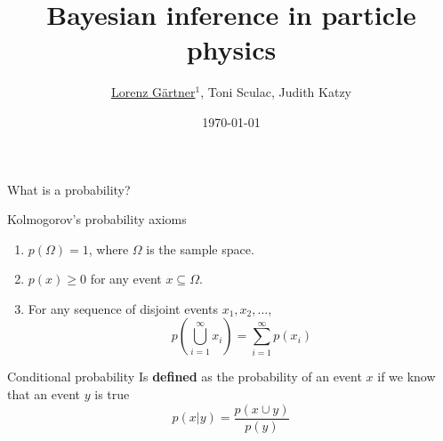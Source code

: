 \documentclass[
aspectratio=169,
14pt,
professionalfonts
]{beamer}
\title[]{Bayesian inference in particle physics}
\author[L. G\"artner]{\underline{Lorenz G\"artner}$^{1}$, Toni Sculac, Judith Katzy }
\institute[LMU]{$^1$LMU Munich}
\date{\today}
\begin{document}
\begin{frame}[titleslide]
    \titlepage
\end{frame}

\begin{frame}

\centering
\Large
What is a probability?
\end{frame}

\begin{frame}{Kolmogorov's probability axioms}
\begin{enumerate}
  \item $ p(\Omega) = 1 $, where \( \Omega \) is the sample space.
  \item $ p(x) \geq 0 $ for any event \( x \subseteq \Omega \).
  \item For any sequence of disjoint events \( x_1, x_2, \dots \), 
        $$
        p\left( \bigcup_{i=1}^{\infty} x_i \right) = \sum_{i=1}^{\infty} p(x_i)
        $$
\end{enumerate}
\end{frame}


\begin{frame}{Conditional probability}
Is \textbf{defined} as the probability of an event $x$ if we know that an event $y$ is true
$$p(x|y) = \frac{p(x \cup y)}{p(y)}$$
\end{frame}
\end{document}

